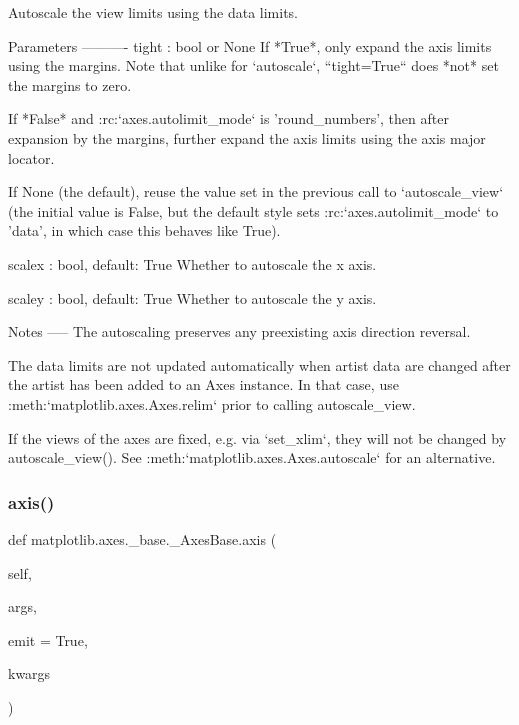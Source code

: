 \begin{DoxyVerb}Autoscale the view limits using the data limits.

Parameters
----------
tight : bool or None
    If *True*, only expand the axis limits using the margins.  Note
    that unlike for `autoscale`, ``tight=True`` does *not* set the
    margins to zero.

    If *False* and :rc:`axes.autolimit_mode` is 'round_numbers', then
    after expansion by the margins, further expand the axis limits
    using the axis major locator.

    If None (the default), reuse the value set in the previous call to
    `autoscale_view` (the initial value is False, but the default style
    sets :rc:`axes.autolimit_mode` to 'data', in which case this
    behaves like True).

scalex : bool, default: True
    Whether to autoscale the x axis.

scaley : bool, default: True
    Whether to autoscale the y axis.

Notes
-----
The autoscaling preserves any preexisting axis direction reversal.

The data limits are not updated automatically when artist data are
changed after the artist has been added to an Axes instance.  In that
case, use :meth:`matplotlib.axes.Axes.relim` prior to calling
autoscale_view.

If the views of the axes are fixed, e.g. via `set_xlim`, they will
not be changed by autoscale_view().
See :meth:`matplotlib.axes.Axes.autoscale` for an alternative.
\end{DoxyVerb}
 \mbox{\label{classmatplotlib_1_1axes_1_1__base_1_1__AxesBase_a9c63db539d7ab6bcb071919bdfd8af8f}} 
\subsubsection{\texorpdfstring{axis()}{axis()}}
{\footnotesize\ttfamily def matplotlib.\+axes.\+\_\+base.\+\_\+\+Axes\+Base.\+axis (\begin{DoxyParamCaption}\item[{}]{self,  }\item[{}]{args,  }\item[{}]{emit = {\ttfamily True},  }\item[{}]{kwargs }\end{DoxyParamCaption})}

